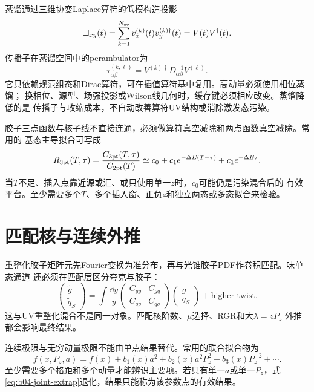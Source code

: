 蒸馏通过三维协变Laplace算符的低模构造投影
\begin{equation}
  \Box_{xy}(t)=\sum_{k=1}^{N_{\rm ev}}v_x^{(k)}(t)v_y^{(k)\dagger}(t)
  =V(t)V^\dagger(t).
  \label{eq:b04-distillation}
\end{equation}
传播子在蒸馏空间中的perambulator为
\begin{equation}
  \tau^{(k,\ell)}_{\alpha\beta}
  =V^{(k)\dagger}D^{-1}_{\alpha\beta}V^{(\ell)}.
  \label{eq:b04-perambulator}
\end{equation}
它只依赖规范组态和Dirac算符，可在插值算符基中复用。高动量必须使用相位蒸馏；
换相位、源型、场强投影或Wilson线几何时，缓存键必须相应改变。蒸馏降低的是
传播子与收缩成本，不自动改善算符UV结构或消除激发态污染。

胶子三点函数与核子线不直接连通，必须做算符真空减除和两点函数真空减除。常用的
基态主导拟合可写成
\begin{equation}
  R_{3{\rm pt}}(T,\tau)
  =\frac{C_{3{\rm pt}}(T,\tau)}{C_{2{\rm pt}}(T)}
  \simeq c_0+c_1e^{-\Delta E(T-\tau)}
  +c_1e^{-\Delta E\tau}.
  \label{eq:b04-gluon-ratio}
\end{equation}
当$T$不足、插入点靠近源或汇、或只使用单一$z$时，$c_0$可能仍是污染混合后的
有效平台。至少需要多个$T$、多个插入窗、正负$z$和独立两态或多态拟合来检验。

\section{匹配核与连续外推}

重整化胶子矩阵元先Fourier变换为准分布，再与光锥胶子PDF作卷积匹配。味单态通道
还必须在匹配层区分夸克与胶子：
\begin{equation}
  \begin{pmatrix}\tilde g\\ \tilde q_S\end{pmatrix}
  =\int\frac{\dd y}{y}
  \begin{pmatrix}C_{gg}&C_{gq}\\C_{qg}&C_{qq}\end{pmatrix}
  \begin{pmatrix}g\\q_S\end{pmatrix}
  +\text{higher twist}.
  \label{eq:b04-gluon-matching}
\end{equation}
这与UV重整化混合不是同一对象。匹配核阶数、$\mu$选择、RGR和大$\lambda=zP_z$
外推都会影响最终结果。

连续极限与无穷动量极限不能由单点结果替代。常用的联合拟合物为
\begin{equation}
  f(x,P_z,a)
  =f(x)+b_1(x)a^2+b_2(x)a^2P_z^2
  +b_3(x)P_z^{-2}+\cdots .
  \label{eq:b04-joint-extrap}
\end{equation}
至少需要多个格距和多个动量才能辨识主要项。若只有单一$a$或单一$P_z$，式
\eqref{eq:b04-joint-extrap}退化，结果只能称为该参数点的有效结果。

